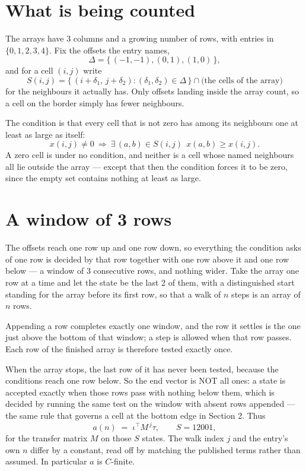 \documentclass[11pt,a4paper]{article}
\theoremstyle{plain}
\theoremstyle{definition}
\begin{document}
\section{What is being counted}

The arrays have $3$ columns and a growing number of rows, with entries in $\{0,1,2,3,4\}$. Fix the
offsets the entry names,
\[
\Delta=\{\,(-1,-1), (0,1), (1,0)\,\},
\]
and for a cell $(i,j)$ write
\[
S(i,j)=\{\,(i+\delta_1,\,j+\delta_2) : (\delta_1,\delta_2)\in\Delta\,\}\cap
\text{(the cells of the array)}
\]
for the neighbours it actually has. Only offsets landing inside the array count, so a cell on
the border simply has fewer neighbours.

The condition is that every cell that is not zero has among its neighbours one at least as large as itself:
\[
x(i,j)\neq0\ \Longrightarrow\ \exists\,(a,b)\in S(i,j)\ \ x(a,b)\ge x(i,j).
\]
A zero cell is under no condition, and neither is a cell whose named neighbours all lie outside the array --- except that then the condition forces it to be zero, since the empty set contains nothing at least as large.

\section{A window of 3 rows}

The offsets reach one row up and one row down, so everything the condition asks of one row is
decided by that row together with one row above it and one row below --- a window of
$3$ consecutive rows, and nothing wider. Take the array one row at a time and
let the state be the last 2 of them, with a distinguished start standing for the array before its
first row, so that a walk of $n$ steps is an array of $n$ rows.

Appending a row completes exactly one window, and the row it settles is the one just above the bottom of that window; a step is
allowed when that row passes. Each row of the finished array is therefore tested exactly once.

When the array stops, the last row of it has never been tested, because the
conditions reach one row below. So the end vector is NOT all ones: a state is accepted exactly when
those rows pass with nothing below them, which is decided by running the same test on the window
with absent rows appended --- the same rule that governs a cell at the bottom edge in
Section 2.
Thus
\[
a(n)\;=\;\iota^{\!\top}M^{\,j}\tau ,\qquad S=12001,
\]
for the transfer matrix $M$ on those $S$ states. The walk index $j$ and the entry's own $n$
differ by a constant, read off by matching the published terms rather than assumed. In
particular $a$ is $C$-finite.
\end{document}
